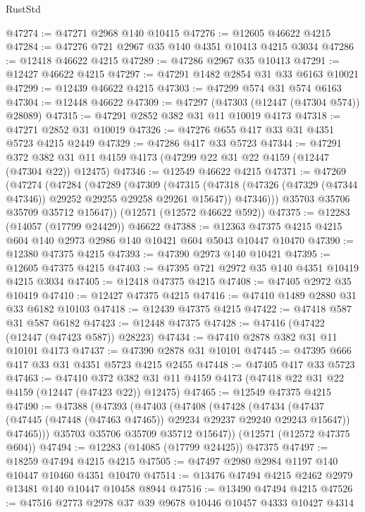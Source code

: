 \begin{lexlean}{RustStd}
\begin{coremodule}
@47274 := @47271 @2968 @140 @10415
@47276 := @12605 @46622 @4215
@47284 := @47276 @721 @2967 @35 @140 @4351 @10413 @4215 @3034
@47286 := @12418 @46622 @4215
@47289 := @47286 @2967 @35 @10413
@47291 := @12427 @46622 @4215
@47297 := @47291 @1482 @2854 @31 @33 @6163 @10021
@47299 := @12439 @46622 @4215
@47303 := @47299 @574 @31 @574 @6163
@47304 := @12448 @46622
@47309 := @47297 (@47303 (@12447 (@47304 @574)) @28089)
@47315 := @47291 @2852 @382 @31 @11 @10019 @4173
@47318 := @47271 @2852 @31 @10019
@47326 := @47276 @655 @417 @33 @31 @4351 @5723 @4215 @2449
@47329 := @47286 @417 @33 @5723
@47344 := @47291
    @372
    @382
    @31
    @11
    @4159
    @4173
    (@47299 @22 @31 @22 @4159 (@12447 (@47304 @22)) @12475)
@47346 := @12549 @46622 @4215
@47371 := @47269
    (@47274
      (@47284
        (@47289
          (@47309
            (@47315
              (@47318 (@47326 (@47329 (@47344 @47346)) @29252 @29255 @29258 @29261 @15647))
              @47346)))
        @35703
        @35706
        @35709
        @35712
        @15647))
    (@12571 (@12572 @46622 @592))
@47375 := @12283 (@14057 (@17799 @24429)) @46622
@47388 := @12363 @47375 @4215 @4215 @604 @140 @2973 @2986 @140 @10421 @604 @5043 @10447 @10470
@47390 := @12380 @47375 @4215
@47393 := @47390 @2973 @140 @10421
@47395 := @12605 @47375 @4215
@47403 := @47395 @721 @2972 @35 @140 @4351 @10419 @4215 @3034
@47405 := @12418 @47375 @4215
@47408 := @47405 @2972 @35 @10419
@47410 := @12427 @47375 @4215
@47416 := @47410 @1489 @2880 @31 @33 @6182 @10103
@47418 := @12439 @47375 @4215
@47422 := @47418 @587 @31 @587 @6182
@47423 := @12448 @47375
@47428 := @47416 (@47422 (@12447 (@47423 @587)) @28223)
@47434 := @47410 @2878 @382 @31 @11 @10101 @4173
@47437 := @47390 @2878 @31 @10101
@47445 := @47395 @666 @417 @33 @31 @4351 @5723 @4215 @2455
@47448 := @47405 @417 @33 @5723
@47463 := @47410
    @372
    @382
    @31
    @11
    @4159
    @4173
    (@47418 @22 @31 @22 @4159 (@12447 (@47423 @22)) @12475)
@47465 := @12549 @47375 @4215
@47490 := @47388
    (@47393
      (@47403
        (@47408
          (@47428
            (@47434
              (@47437 (@47445 (@47448 (@47463 @47465)) @29234 @29237 @29240 @29243 @15647))
              @47465)))
        @35703
        @35706
        @35709
        @35712
        @15647))
    (@12571 (@12572 @47375 @604))
@47494 := @12283 (@14085 (@17799 @24425)) @47375
@47497 := @18259 @47494 @4215 @4215
@47505 := @47497 @2980 @2984 @1197 @140 @10447 @10460 @4351 @10470
@47514 := @13476 @47494 @4215 @2462 @2979 @13481 @140 @10447 @10458 @8944
@47516 := @13490 @47494 @4215
@47526 := @47516 @2773 @2978 @37 @39 @9678 @10446 @10457 @4333 @10427 @4314

\end{coremodule}
\end{lexlean}
